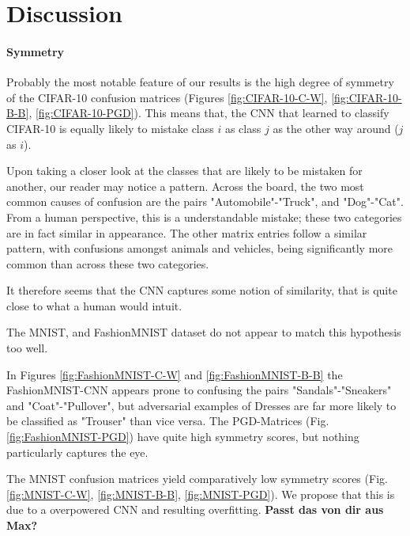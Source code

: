 \documentclass{article}
\begin{document}
\section{Discussion}

\paragraph{Symmetry}
Probably the most notable feature of our results is the high degree of symmetry of the CIFAR-10 confusion matrices (Figures \ref{fig:CIFAR-10-C-W}, \ref{fig:CIFAR-10-B-B}, \ref{fig:CIFAR-10-PGD}). This means that, the CNN that learned to classify CIFAR-10 is equally likely to mistake class $i$ as class $j$ as the other way around ($j$ as $i$).

Upon taking a closer look at the classes that are likely to be mistaken for another, our reader may notice a pattern. Across the board, the two most common causes of confusion are the pairs "Automobile"-"Truck", and "Dog"-"Cat". From a human perspective, this is a understandable mistake; these two categories are in fact similar in appearance. The other matrix entries follow a similar pattern, with confusions amongst animals and vehicles, being significantly more common than across these two categories.

It therefore seems that the CNN captures some notion of similarity, that is quite close to what a human would intuit.
\vspace{12pt}


The MNIST, and FashionMNIST dataset do not appear to match this hypothesis too well.

In Figures \ref{fig:FashionMNIST-C-W} and \ref{fig:FashionMNIST-B-B} the FashionMNIST-CNN appears prone to confusing the pairs "Sandals"-"Sneakers" and "Coat"-"Pullover", but adversarial examples of Dresses are far more likely to be classified as "Trouser" than vice versa. The PGD-Matrices (Fig. \ref{fig:FashionMNIST-PGD}) have quite high symmetry scores, but nothing particularly captures the eye.

The MNIST confusion matrices yield comparatively low symmetry scores (Fig. \ref{fig:MNIST-C-W}, \ref{fig:MNIST-B-B}, \ref{fig:MNIST-PGD}). We propose that this is due to a overpowered CNN and resulting overfitting. \textbf{Passt das von dir aus Max?}
\end{document}
